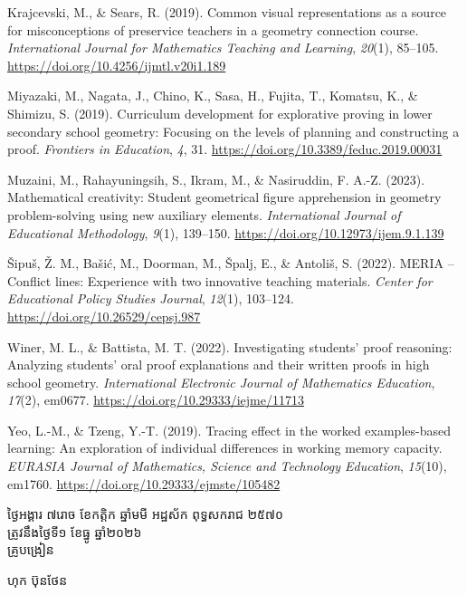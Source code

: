 \documentclass[a4paper,12pt]{article}
\begin{document}
{Krajcevski, M., \& Sears, R. (2019). Common visual representations as a source for misconceptions of preservice teachers in a geometry connection course. \textit{International Journal for Mathematics Teaching and Learning}, \textit{20}(1), 85--105. \url{https://doi.org/10.4256/ijmtl.v20i1.189}

Miyazaki, M., Nagata, J., Chino, K., Sasa, H., Fujita, T., Komatsu, K., \& Shimizu, S. (2019). Curriculum development for explorative proving in lower secondary school geometry: Focusing on the levels of planning and constructing a proof. \textit{Frontiers in Education}, \textit{4}, 31. \url{https://doi.org/10.3389/feduc.2019.00031}

Muzaini, M., Rahayuningsih, S., Ikram, M., \& Nasiruddin, F. A.-Z. (2023). Mathematical creativity: Student geometrical figure apprehension in geometry problem-solving using new auxiliary elements. \textit{International Journal of Educational Methodology}, \textit{9}(1), 139--150. \url{https://doi.org/10.12973/ijem.9.1.139}

Šipuš, Ž. M., Bašić, M., Doorman, M., Špalj, E., \& Antoliš, S. (2022). MERIA -- Conflict lines: Experience with two innovative teaching materials. \textit{Center for Educational Policy Studies Journal}, \textit{12}(1), 103--124. \url{https://doi.org/10.26529/cepsj.987}

Winer, M. L., \& Battista, M. T. (2022). Investigating students’ proof reasoning: Analyzing students’ oral proof explanations and their written proofs in high school geometry. \textit{International Electronic Journal of Mathematics Education}, \textit{17}(2), em0677. \url{https://doi.org/10.29333/iejme/11713}

Yeo, L.-M., \& Tzeng, Y.-T. (2019). Tracing effect in the worked examples-based learning: An exploration of individual differences in working memory capacity. \textit{EURASIA Journal of Mathematics, Science and Technology Education}, \textit{15}(10), em1760. \url{https://doi.org/10.29333/ejmste/105482}
\par}

\vspace{20pt}
\Needspace{2.0cm}
\hfill
\begin{minipage}{9.8cm}
  {\centering
    ថ្ងៃអង្គារ ៧រោច ខែកត្តិក ឆ្នាំមមី អដ្ឋស័ក ពុទ្ធសករាជ ២៥៧០\\[2pt]
    ត្រូវនឹងថ្ងៃទី១ ខែធ្នូ ឆ្នាំ២០២៦\\[3pt]
    {\muol គ្រូបង្រៀន}\par}
  \vspace{32pt}
  \hfill{\muol ហុក ប៊ុនថែន}\hspace*{1.4cm}
\end{minipage}
\end{document}
